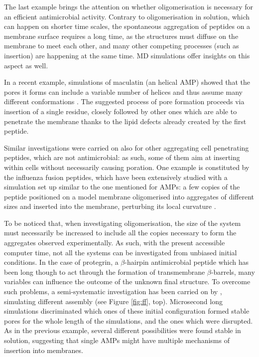 The last example brings the attention on whether oligomerisation is necessary for an efficient antimicrobial activity. Contrary to oligomerisation in solution, which can happen on shorter time scales, the spontaneous aggregation of peptides on a membrane surface requires a long time, as the structures must diffuse on the membrane to meet each other, and many other competing processes (such as insertion) are happening at the same time. MD simulations offer insights on this aspect as well.

In a recent example, simulations of maculatin (an helical AMP) showed that the pores it forms can include a variable number of helices and thus assume many different conformations \citep{Wang2016}. The suggested process of pore formation proceeds via insertion of a single residue, closely followed by other ones which are able to penetrate the membrane thanks to the lipid defects already created by the first peptide.

Similar investigations were carried on also for other aggregating cell penetrating peptides, which are not antimicrobial: as such, some of them aim at inserting within cells without necessarily causing poration. One example is constituted by the influenza fusion peptides, which have been extensively studied with a simulation set up similar to the one mentioned for AMPs: a few copies of the peptide positioned on a model membrane oligomerised into aggregates of different sizes and inserted into the membrane, perturbing its local curvature \citep{Haria2014,Collu2015}.

To be noticed that, when investigating oligomerisation, the size of the system must necessarily be increased to include all the copies necessary to form the aggregates observed experimentally. As such, with the present accessible computer time, not all the systems can be investigated from unbiased initial conditions.
%
In the case of protegrin, a $\beta$-hairpin antimicrobial peptide which has been long though to act through the formation of transmembrane $\beta$-barrels, many variables can influence the outcome of the unknown final structure.
%
To overcome such problems, a semi-systematic investigation has been carried on by \citet{Lipkin2017}, simulating different assembly (see Figure \ref{fig:ff}, top).
%
Microsecond long simulations discriminated which ones of these initial configuration formed stable pores for the whole length of the simulations, and the ones which were disrupted. As in the previous example, several different possibilities were found stable in solution, suggesting that single AMPs might have multiple mechanisms of insertion into membranes.

